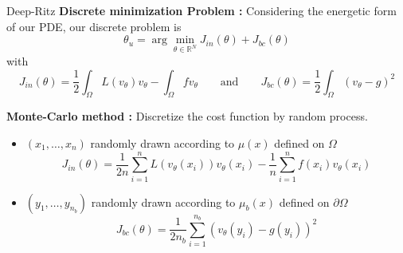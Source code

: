 \begin{frame}{Deep-Ritz}
	\textbf{Discrete minimization Problem :} Considering the energetic form of our PDE, our discrete problem is
	\begin{equation}
		\theta_u=\arg\min_{\theta\in\mathbb{R}^N} J_{in}(\theta)+J_{bc}(\theta) \label{minpb_deepritz}
	\end{equation}
	with 
	\begin{equation*}
		J_{in}(\theta)=\frac{1}{2}\int_\Omega L(v_\theta)v_\theta - \int_\Omega fv_\theta  \qquad \text{and} \qquad J_{bc}(\theta)=\frac{1}{2}\int_\Omega (v_\theta-g)^2
	\end{equation*}	
	
	\textbf{Monte-Carlo method :} Discretize the cost function by random process.
	
	\begin{itemize}[\textbullet]
		\item $(x_1,\dots,x_n)$ randomly drawn according to $\mu(x)$ defined on $\Omega$ 
		\begin{equation*}
			J_{in}(\theta)=\frac{1}{2n}\sum_{i=1}^n L(v_\theta(x_i))v_\theta(x_i) - \frac{1}{n}\sum_{i=1}^n f(x_i)v_\theta(x_i)
		\end{equation*}
		\item $(y_1,\dots,y_{n_b})$ randomly drawn according to $\mu_b(x)$ defined on $\partial\Omega$
		\begin{equation*}
			J_{bc}(\theta)=\frac{1}{2n_b}\sum_{i=1}^{n_b} (v_\theta(y_i)-g(y_i))^2
		\end{equation*}
	\end{itemize}	
\end{frame}

